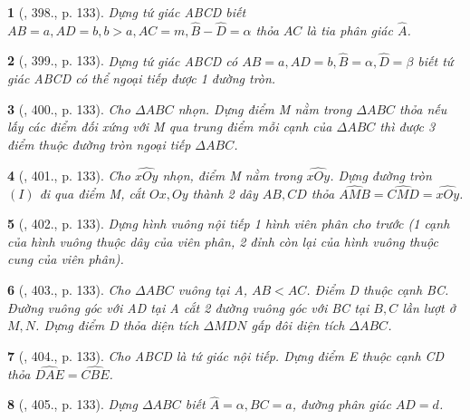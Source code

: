 \documentclass{article}
\newtheorem{baitoan}{}
\begin{document}
\begin{baitoan}[\cite{Binh_Toan_9_tap_2}, 398., p. 133]
	Dựng tứ giác ABCD biết $AB = a,AD = b,b > a,AC = m,\widehat{B} - \widehat{D} = \alpha$ thỏa $AC$ là tia phân giác $\widehat{A}$.
\end{baitoan}

\begin{baitoan}[\cite{Binh_Toan_9_tap_2}, 399., p. 133]
	Dựng tứ giác ABCD có $AB = a,AD = b,\widehat{B} = \alpha,\widehat{D} = \beta$ biết tứ giác ABCD có thể ngoại tiếp được 1 đường tròn.
\end{baitoan}

\begin{baitoan}[\cite{Binh_Toan_9_tap_2}, 400., p. 133]
	Cho $\Delta ABC$ nhọn. Dựng điểm M nằm trong $\Delta ABC$ thỏa nếu lấy các điểm đối xứng với M qua trung điểm mỗi cạnh của $\Delta ABC$ thì được 3 điểm thuộc đường tròn ngoại tiếp $\Delta ABC$.
\end{baitoan}

\begin{baitoan}[\cite{Binh_Toan_9_tap_2}, 401., p. 133]
	Cho $\widehat{xOy}$ nhọn, điểm M nằm trong $\widehat{xOy}$. Dựng đường tròn $(I)$ đi qua điểm M, cắt $Ox,Oy$ thành 2 dây $AB,CD$ thỏa $\widehat{AMB} = \widehat{CMD} = \widehat{xOy}$.
\end{baitoan}

\begin{baitoan}[\cite{Binh_Toan_9_tap_2}, 402., p. 133]
	Dựng hình vuông nội tiếp 1 hình viên phân cho trước (1 cạnh của hình vuông thuộc dây của viên phân, 2 đỉnh còn lại của hình vuông thuộc cung của viên phân).
\end{baitoan}

\begin{baitoan}[\cite{Binh_Toan_9_tap_2}, 403., p. 133]
	Cho $\Delta ABC$ vuông tại A, $AB < AC$. Điểm D thuộc cạnh BC. Đường vuông góc với AD tại A cắt 2 đường vuông góc với BC tại $B,C$ lần lượt ở $M,N$. Dựng điểm D thỏa diện tích $\Delta MDN$ gấp đôi diện tích $\Delta ABC$.
\end{baitoan}

\begin{baitoan}[\cite{Binh_Toan_9_tap_2}, 404., p. 133]
	Cho ABCD là tứ giác nội tiếp. Dựng điểm E thuộc cạnh CD thỏa $\widehat{DAE} = \widehat{CBE}$.
\end{baitoan}

\begin{baitoan}[\cite{Binh_Toan_9_tap_2}, 405., p. 133]
	Dựng $\Delta ABC$ biết $\widehat{A} = \alpha,BC = a$, đường phân giác $AD = d$.
\end{baitoan}
\end{document}
